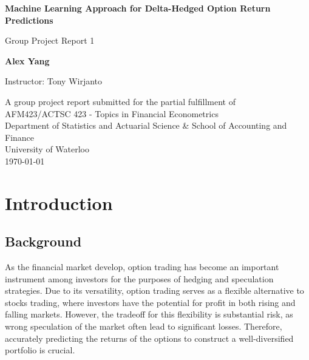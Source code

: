 \documentclass[oneside, 12pt]{article}
\newcommand*{\1}{\text{\scalebox{1.1}{\usefont{U}{bbold}{m}{n}1}}}
\begin{document}
\begin{titlepage}
    \begin{center}
        \vspace*{1cm} %
        
        {\Huge\textbf{Machine Learning Approach for Delta-Hedged Option Return Predictions}} %
        
        \vspace{0.5cm} %
        
        {\Large Group Project Report 1} %
        
        \vspace{1.5cm} %
        
        {\Large\textbf{Alex Yang}} %
        
        
        \vspace{1cm}
        {\Large Instructor: Tony Wirjanto}

        \vfill %

        A group project report submitted for the partial fulfillment of\\
        AFM423/ACTSC 423 - Topics in Financial Econometrics
        \vspace{0.8cm}
        \\[0.5cm]
        Department of Statistics and Actuarial Science \& School of Accounting and Finance\\
        University of Waterloo\\
        \today
    \end{center}
    
\end{titlepage}

\tableofcontents

\newpage

\section{Introduction}
\subsection{Background}
As the financial market develop, option trading has become an important instrument among investors for the purposes of hedging and speculation strategies. Due to its versatility, option trading serves as a flexible alternative to stocks trading, where investors have the potential for profit in both rising and falling markets. However, the tradeoff for this flexibility is substantial risk, as wrong speculation of the market often lead to significant losses. Therefore, accurately predicting the returns of the options to construct a well-diversified portfolio is crucial.  \newline
\end{document}
